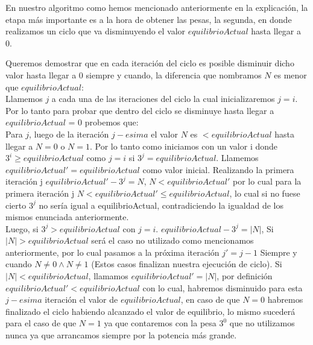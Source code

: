 
En nuestro algoritmo como hemos mencionado anteriormente en la explicaci\'on, la etapa m\'as importante es a la hora de obtener las pesas, la segunda, en donde realizamos un ciclo que va disminuyendo el valor $equilibrioActual$ hasta llegar a 0. 

Queremos demostrar que en cada iteraci\'on del ciclo es posible disminuir dicho valor hasta llegar a 0 siempre y cuando, la diferencia que nombramos $N$ es menor que $equilibrioActual$:\\


Llamemos $j$ a cada una de las iteraciones del ciclo la cual inicializaremos $j = i$.\\
Por lo tanto para probar que dentro del ciclo se disminuye hasta llegar a $equilibrioActual$ = 0 probemos que:\\

Para $j$, luego de la iteraci\'on $j-esima$ el valor $N$ es $< equilibrioActual$ hasta llegar a $N = 0$ o $N = 1$. Por lo tanto como iniciamos con un valor i donde ${3^i}\geq equilibrioActual$ como $j=i$ si ${3^j} = equilibrioActual$. Llamemos $equilibrioActual' = equilibrioActual$ como valor inicial. Realizando la primera iteraci\'on j $equilibrioActual' - {3^j} = N$, $N < equilibrioActual'$ por lo cual para la primera iteraci\'on j $N < equilibrioActual' \leq equilibrioActual$, lo cual si no fuese cierto ${3^j}$ no ser\'ia igual a equilibrioActual, contradiciendo la igualdad de los mismos enunciada anteriormente.\\

Luego, si ${3^j} > equilibrioActual$ con $j=i$. $equilibrioActual - {3^j} = |N|$, Si $|N| > equilibrioActual$ ser\'a el caso no utilizado como mencionamos anteriormente, por lo cual pasamos a la pr\'oxima iteraci\'on $j'= j-1$ Siempre y cuando $N \neq 0 \wedge N \neq 1$ (Estos casos finalizan nuestra ejecuci\'on de ciclo). Si $|N| < equilibrioActual$, llamamos $equilibrioActual' = |N|$, por definici\'on $equilibrioActual' < equilibrioActual$ con lo cual, habremos disminuido para esta $j-esima$ iteraci\'on el valor de $equilibrioActual$, en caso de que $N = 0$ habremos finalizado el ciclo habiendo alcanzado el valor de equilibrio, lo mismo suceder\'a para el caso de que $N = 1$ ya que contaremos con la pesa ${3^0}$ que no utilizamos nunca ya que arrancamos siempre por la potencia m\'as grande.\\

